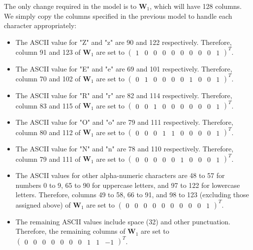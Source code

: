 \documentclass{somasmsc}
\begin{document}
The only change required in the model is to $\mathbf{W}_1$, which will have 128 columns. We simply copy the columns specified in the previous model to handle each character appropriately:
\begin{itemize}
    \item The ASCII value for "Z" and "z" are 90 and 122 respectively. Therefore, column 91 and 123 of $\mathbf{W}_1$ are set to $\begin{pmatrix}
        1 & 0 & 0 & 0 & 0 & 0 & 0 & 0 & 0 & 1
    \end{pmatrix}^T$.
    \item The ASCII value for "E" and "e" are 69 and 101 respectively. Therefore, column 70 and 102 of $\mathbf{W}_1$ are set to $\begin{pmatrix}
        0 & 1 & 0 & 0 & 0 & 0 & 1 & 0 & 0 & 1
    \end{pmatrix}^T$.
    \item The ASCII value for "R" and "r" are 82 and 114 respectively. Therefore, column 83 and 115 of $\mathbf{W}_1$ are set to $\begin{pmatrix}
        0 & 0 & 1 & 0 & 0 & 0 & 0 & 0 & 0 & 1
    \end{pmatrix}^T$.
    \item The ASCII value for "O" and "o" are 79 and 111 respectively. Therefore, column 80 and 112 of $\mathbf{W}_1$ are set to $\begin{pmatrix}
        0 & 0 & 0 & 1 & 1 & 0 & 0 & 0 & 0 & 1
    \end{pmatrix}^T$.
    \item The ASCII value for "N" and "n" are 78 and 110 respectively. Therefore, column 79 and 111 of $\mathbf{W}_1$ are set to $\begin{pmatrix}
        0 & 0 & 0 & 0 & 0 & 1 & 0 & 0 & 0 & 1
    \end{pmatrix}^T$.
    \item The ASCII values for other alpha-numeric characters are 48 to 57 for numbers 0 to 9, 65 to 90 for uppercase letters, and 97 to 122 for lowercase letters. Therefore, columns 49 to 58, 66 to 91, and 98 to 123 (excluding those assigned above) of $\mathbf{W}_1$ are set to $\begin{pmatrix}
        0 & 0 & 0 & 0 & 0 & 0 & 0 & 0 & 0 & 1
    \end{pmatrix}^T$.
    \item The remaining ASCII values include space (32) and other punctuation. Therefore, the remaining columns of $\mathbf{W}_1$ are set to \\ $\begin{pmatrix}
        0 & 0 & 0 & 0 & 0 & 0 & 0 & 1 & 1 & -1
    \end{pmatrix}^T$.
\end{itemize}
\end{document}
